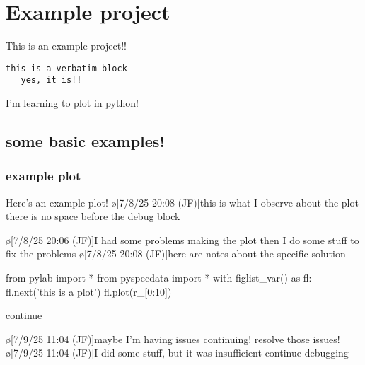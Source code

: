\section{Example project}
This is an example project!!
\begin{verbatim}
this is a verbatim block
   yes, it is!!
\end{verbatim}
I'm learning to plot in python!

\subsection{some basic examples!}
\subsubsection{example plot}\label{sec:examplePlot1}
Here's an example plot!
\o[7/8/25 20:08 (JF)]{this is what I observe about the plot there is no space before the debug block}
\begin{err}
    \o[7/8/25 20:06 (JF)]{I had some problems making the plot}
    then I do some stuff to fix the problems
    \o[7/8/25 20:08 (JF)]{here are notes about the specific solution}
\end{err}
\par
\begin{python}[on]
from pylab import *
from pyspecdata import *
with figlist_var() as fl:
    fl.next('this is a plot')
    fl.plot(r_[0:10])
\end{python}
\par
continue

\begin{err}
    \o[7/9/25 11:04 (JF)]{maybe I'm having issues continuing!}
    resolve those issues!
    \o[7/9/25 11:04 (JF)]{I did some stuff, but it was insufficient}
    continue debugging

\end{err}
